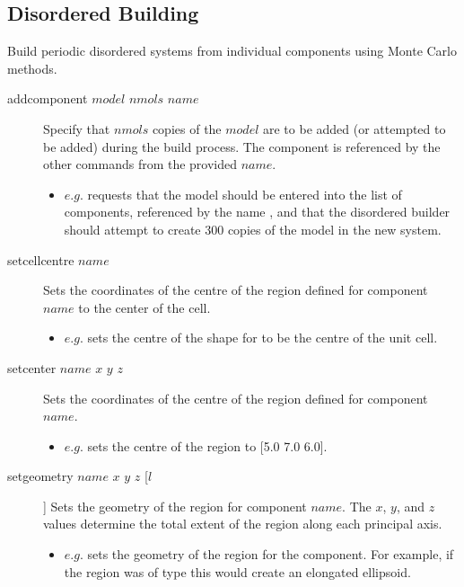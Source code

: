 \subsection{Disordered Building}
Build periodic disordered systems from individual components using Monte Carlo methods.\\
\begin{description}

	\item[addcomponent $model$ $nmols$ $name$\its] Specify that $nmols$ copies of the $model$ are to be added (or attempted to be added) during the build process. The component is referenced by the other commands from the provided $name$.
	\begin{itemize}
		\item $e.g.$  requests that the  model should be entered into the list of components, referenced by the name , and that the disordered builder should attempt to create 300 copies of the model in the new system.
	\end{itemize}

	\item[setcellcentre $name$\its] Sets the coordinates of the centre of the region defined for component $name$ to the center of the cell.
	\begin{itemize}
		\item $e.g.$  sets the centre of the shape for  to be the centre of the unit cell.
	\end{itemize}

	\item[setcenter $name$ $x$ $y$ $z$\its] Sets the coordinates of the centre of the region defined for component $name$.
	\begin{itemize}
		\item $e.g.$  sets the centre of the  region to [5.0 7.0 6.0].
	\end{itemize}

	\item[setgeometry $name$ $x$ $y$ $z$ [$l$]\its] Sets the geometry of the region for component $name$. The $x$, $y$, and $z$ values determine the total extent of the region along each principal axis.
	\begin{itemize}
		\item $e.g.$  sets the geometry of the region for the  component. For example, if the region was of type  this would create an elongated ellipsoid.
	\end{itemize}


\end{description}

